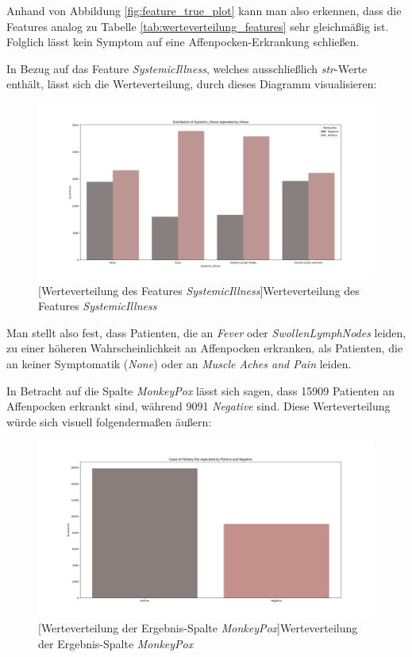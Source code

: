\documentclass[13pt,a4paper, listof=entryprefix, bibliography=totocnumbered,toc=listofnumbered,lof=listofnumbered]{scrartcl}
\begin{document}
Anhand von Abbildung \ref{fig:feature_true_plot} kann man also erkennen, dass die Features analog zu Tabelle \ref{tab:werteverteilung_features}	sehr gleichmäßig ist.
Folglich lässt kein Symptom auf eine Affenpocken-Erkrankung schließen. 

In Bezug auf das Feature \textit{Systemic\textunderscore Illness}, welches ausschließlich \textit{str}-Werte enthält, lässt sich die 
Werteverteilung, durch dieses Diagramm visualisieren: 

	\begin{figure}[H]
		\centering
		\includegraphics[width=0.8\linewidth]{Bilder/systemic_illness_plot.png}
		[Werteverteilung des Features \textit{Systemic\textunderscore Illness}]{Werteverteilung des Features \textit{Systemic\textunderscore Illness}}
		\label{fig:systemic_illness_plot}
	\end{figure}

Man stellt also fest, dass Patienten, die an \textit{Fever} oder \textit{Swollen\textunderscore Lymph\textunderscore Nodes} leiden, zu einer
höheren Wahrscheinlichkeit an Affenpocken erkranken, als Patienten, die an keiner Symptomatik (\textit{None}) oder an \textit{Muscle Aches and Pain} leiden.

In Betracht auf die Spalte \textit{MonkeyPox} lässt sich sagen, dass 15909 Patienten an Affenpocken erkrankt sind, während 9091 \textit{Negative} sind.
Diese Werteverteilung würde sich visuell folgendermaßen äußern:

	\begin{figure}[H]
		\centering
		\includegraphics[width=0.8\linewidth]{Bilder/monkey_pox_plot.png}
		[Werteverteilung der Ergebnis-Spalte \textit{MonkeyPox}]{Werteverteilung der Ergebnis-Spalte \textit{MonkeyPox}}
		\label{fig:monkey_pox_plot}
	\end{figure}
\end{document}
